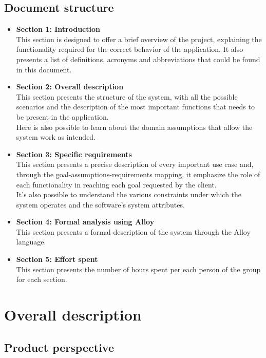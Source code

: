\documentclass[11pt,twoside]{article}
\begin{document}
	\subsection{Document structure}
\begin{itemize}
\item \textbf{Section 1: Introduction} \\
This section is designed to offer a brief overview of the project, explaining the functionality required for the correct behavior of the application. It also presents a list of definitions, acronyms and abbreviations that could be found in this document.
\item \textbf{Section 2: Overall description} \\
This section presents the structure of the system, with all the possible scenarios and the description of the most important functions that needs to be present in the application.\\
Here is also possible to learn about the domain assumptions that allow the system work as intended.
\item \textbf{Section 3: Specific requirements} \\
This section presents a precise description of every important use case and, through the goal-assumptions-requirements mapping, it emphasize the role of each functionality in reaching each goal requested by the client.\\
It's also possible to understand the various constraints under which the system operates and the software's system attributes.
\item \textbf{Section 4: Formal analysis using Alloy} \\
This section presents a formal description of the system through the Alloy language.
\item \textbf{Section 5: Effort spent} \\
This section presents the number of hours spent per each person of the group for each section.
\end{itemize}
\newpage
\section{Overall description}
	\subsection{Product perspective}
\end{document}
